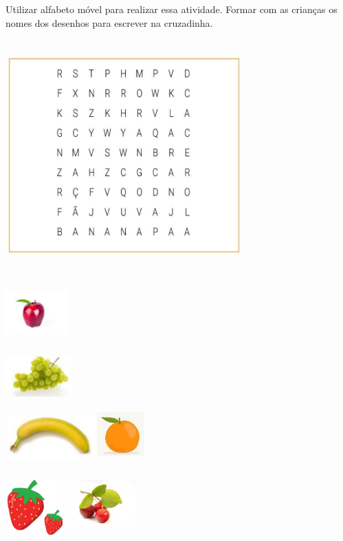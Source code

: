 Utilizar alfabeto móvel para realizar essa atividade. Formar com as
crianças os nomes dos desenhos para escrever na cruzadinha.

\includegraphics[width=3.58333in,height=3.51667in]{media/image97.jpg}

\includegraphics[width=0.92708in,height=0.84375in]{media/image98.jpg}

\includegraphics[width=1.02083in,height=0.67986in]{media/image99.jpg}

\includegraphics[width=1.38958in,height=0.65208in]{media/image100.jpg}\includegraphics[width=0.71875in,height=0.71875in]{media/image101.jpg}

\includegraphics[width=0.89097in,height=0.85417in]{media/image102.jpg}\includegraphics[width=1.07847in,height=0.97917in]{media/image103.jpg}

